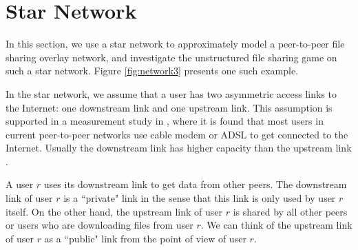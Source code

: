 \documentclass[conference]{IEEEtran}
\begin{document}
\begin{comment}
Depending the values of the number of users $m$ and the number of
links $n$, we can have the following two cases.

\noindent \textbf{Case 1, more users than links.} If $R>L$, then
$X_{min}=m$, and we have $ B_{max}=mC-m.$ In this case, the
efficiency loss of Nash equilibrium is
\begin{equation}
L_{eff}= B_{max}/B_{ne}= \frac{mC-m}{mC- m(n-1)C /n} = n(1-1/C).
\end{equation}
Asymptotically, if $n \to \infty$, $L_{eff}\to \infty$. On the
other hand, if $m,n$ are fixed, and we let $C\to \infty$, then
$L_{eff}\to n$.

\noindent \textbf{Case 2, more links than users.} If $m\le n$,
$X_{min}=n$, then $B_{max}= mC - n.$ Efficiency loss of Nash
equilibrium is
\begin{equation}
L_{eff}= B_{max}/B_{ne}= (mC-n)/(mC/n)= 1- n/(mC).
\end{equation}
If $m,n$ are fixed, and let $C\to \infty$, then $L_{eff} \to 1$.
If $m,C$ are fixed, and let $n\to \infty$, then $L_{eff} \to
-\infty$.

\end{comment}

%


\section{Star Network}\label{sec:star}


In this section, we use a star network to approximately model a
peer-to-peer file sharing overlay network, and investigate the
unstructured file sharing game on such a star network. Figure
\ref{fig:network3} presents one such example.

In the star network, we assume that a user has two asymmetric
access links to the Internet: one downstream link and one upstream
link. This assumption is supported in a measurement study in
\cite{saroiu02measurement}, where it is found that most users in
current peer-to-peer networks use cable modem or ADSL to get
connected to the Internet. Usually the downstream link has higher
capacity than the upstream link \cite{saroiu02measurement}.

A user $r$ uses its downstream link to get data from other peers.
The downstream link of user $r$ is a ``private" link in the sense
that this link is only used by user $r$ itself. On the other hand,
the upstream link of user $r$ is shared by all other peers or
users who are downloading files from user $r$. We can think of the
upstream link of user $r$ as a ``public" link from the point of
view of user $r$.
\end{document}
